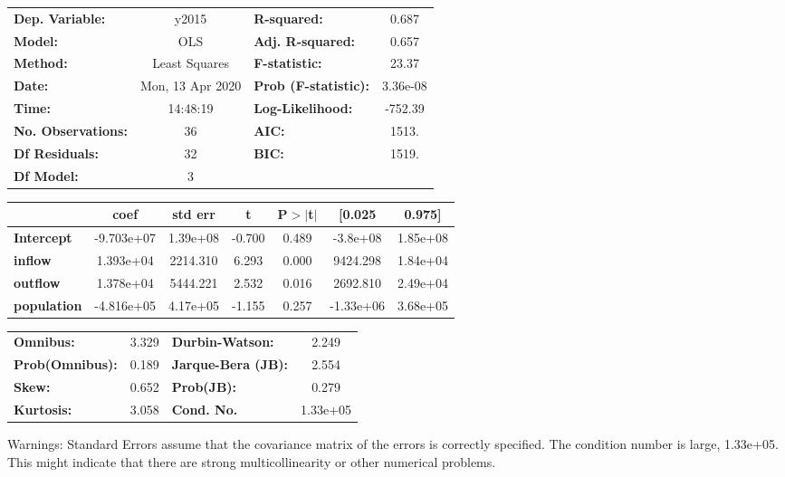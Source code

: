 \begin{center}
\begin{tabular}{lclc}
\toprule
\textbf{Dep. Variable:}    &      y2015       & \textbf{  R-squared:         } &     0.687   \\
\textbf{Model:}            &       OLS        & \textbf{  Adj. R-squared:    } &     0.657   \\
\textbf{Method:}           &  Least Squares   & \textbf{  F-statistic:       } &     23.37   \\
\textbf{Date:}             & Mon, 13 Apr 2020 & \textbf{  Prob (F-statistic):} &  3.36e-08   \\
\textbf{Time:}             &     14:48:19     & \textbf{  Log-Likelihood:    } &   -752.39   \\
\textbf{No. Observations:} &          36      & \textbf{  AIC:               } &     1513.   \\
\textbf{Df Residuals:}     &          32      & \textbf{  BIC:               } &     1519.   \\
\textbf{Df Model:}         &           3      & \textbf{                     } &             \\
\bottomrule
\end{tabular}
\begin{tabular}{lcccccc}
                    & \textbf{coef} & \textbf{std err} & \textbf{t} & \textbf{P$> |$t$|$} & \textbf{[0.025} & \textbf{0.975]}  \\
\midrule
\textbf{Intercept}  &   -9.703e+07  &     1.39e+08     &    -0.700  &         0.489        &     -3.8e+08    &     1.85e+08     \\
\textbf{inflow}     &    1.393e+04  &     2214.310     &     6.293  &         0.000        &     9424.298    &     1.84e+04     \\
\textbf{outflow}    &    1.378e+04  &     5444.221     &     2.532  &         0.016        &     2692.810    &     2.49e+04     \\
\textbf{population} &   -4.816e+05  &     4.17e+05     &    -1.155  &         0.257        &    -1.33e+06    &     3.68e+05     \\
\bottomrule
\end{tabular}
\begin{tabular}{lclc}
\textbf{Omnibus:}       &  3.329 & \textbf{  Durbin-Watson:     } &    2.249  \\
\textbf{Prob(Omnibus):} &  0.189 & \textbf{  Jarque-Bera (JB):  } &    2.554  \\
\textbf{Skew:}          &  0.652 & \textbf{  Prob(JB):          } &    0.279  \\
\textbf{Kurtosis:}      &  3.058 & \textbf{  Cond. No.          } & 1.33e+05  \\
\bottomrule
\end{tabular}
\end{center}

Warnings: \newline
 [1] Standard Errors assume that the covariance matrix of the errors is correctly specified. \newline
 [2] The condition number is large, 1.33e+05. This might indicate that there are \newline
 strong multicollinearity or other numerical problems.